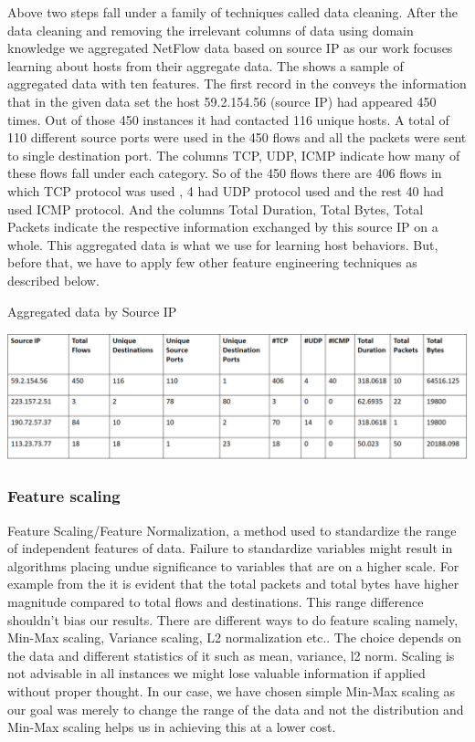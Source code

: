 Above two steps fall under a family of techniques called data cleaning. After the data cleaning and removing the irrelevant columns of data using domain knowledge we aggregated NetFlow data based on source IP as our work focuses learning about hosts from their aggregate data. The  shows a sample of aggregated data with ten features.
The first record in the  conveys the information that in the given data set the host 59.2.154.56 (source IP) had appeared 450 times. Out of those 450 instances it had contacted 116 unique hosts. A total of 110 different source ports were used in the 450 flows and all the packets were sent to single destination port. The columns TCP, UDP, ICMP indicate how many of these flows fall under each category. So of the 450 flows there are 406 flows in which TCP protocol was used , 4 had UDP protocol used and the rest 40 had used ICMP protocol. And the columns Total Duration, Total Bytes, Total Packets indicate the respective information exchanged by this source IP on a whole. This aggregated data is what we use for learning host behaviors. But, before that, we have to apply few other feature engineering techniques as described below.

\begin{table}[b]
	\caption{Aggregated data by Source IP}%
	\centerline{\includegraphics[scale = 0.6]{aggregated.png}}	
\end{table}


\subsubsection{Feature scaling} 
Feature Scaling/Feature Normalization, a method used to standardize the range of independent features of data. Failure to standardize variables might result in algorithms placing undue significance to variables that are on a higher scale. For example from the  it is evident that the total packets and total bytes have higher magnitude compared to total flows and destinations. This range difference shouldn't bias our results.
There are different ways to do feature scaling namely, Min-Max scaling, Variance scaling, L2 normalization etc.. The choice depends on the data and different statistics of it such as mean, variance, l2 norm. Scaling is not advisable in all instances we might lose valuable information if applied without proper thought. In our case, we have chosen simple Min-Max scaling as our goal was merely to change the range of the data and not the distribution and Min-Max scaling helps us in achieving this at a lower cost.

